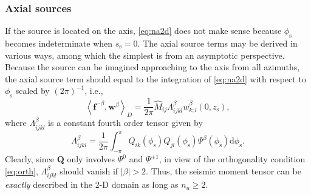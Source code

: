 \documentclass[extra]{gji}
\begin{document}
\subsubsection{Axial sources}
If the source is located on the axis, \eqref{eq:na2d} does not make sense
because $\phi_\text{s}$ becomes indeterminate when $s_\text{s}=0$. 
The axial source terms may be derived in various ways,
among which the simplest is from an asymptotic perspective.
Because the source can be imagined approaching 
to the axis from all azimuths, the axial source term 
should equal to the integration of \eqref{eq:na2d}
with respect to $\phi_\text{s}$ scaled by $\left(2\pi\right)^{-1}$, i.e., 
\begin{equation}
  \left\langle \mathbf{f}^{-\beta},\mathbf{w}^\beta \right\rangle _{D}
  = \frac{1}{2\pi}
  \hat{M}_{ij} \Lambda_{ijkl}^\beta w_{k;l}^\beta\left(0,z_\text{s}\right),
  \label{eq:ax2d} 
\end{equation}
where $\Lambda_{ijkl}^\beta$ is a constant fourth order tensor given by 
\begin{equation}
  \Lambda_{ijkl}^\beta=\frac{1}{2\pi}\int_{-\pi}^{\pi}
  Q_{ik}\left(\phi_\text{s}\right) Q_{jl}\left(\phi_\text{s}\right)
  \Psi^\beta\left(\phi_\text{s}\right) \text{d}\phi_\text{s}.
\end{equation}
Clearly, since $\mathbf{Q}$ only involves $\Psi^0$ and $\Psi^{\pm1}$,
in view of the orthogonality condition \eqref{eq:orth}, $\Lambda_{ijkl}^\beta$
should vanish if $|\beta|>2$. Thus, the seismic moment tensor can be 
\textit{exactly} described in the 2-D domain as long as $n_u\ge2$.  
\end{document}
